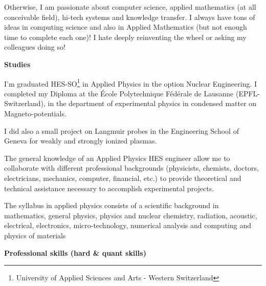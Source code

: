 	Otherwise, I am passionate about computer science, applied mathematics (at all conceivable field), hi-tech systems and knowledge transfer. I always have tons of ideas in computing science and also in Applied Mathematics (but not enough time to complete each one)! I hate deeply reinventing the wheel or asking my colleagues doing so!

\textbf{Studies}	

	I'm graduated HES-SO\footnote{University of Applied Sciences and Arts - Western Switzerland} in Applied Physics in the option Nuclear Engineering. I completed  my Diploma at the École Polytechnique Fédérale de Lausanne (EPFL-Switzerland), in the department of experimental physics in condensed matter on Magneto-potentials.
	
	 I did also a small project on Langmuir probes in the Engineering School of Geneva for weakly and strongly ionized plasmas.
	
	The general knowledge of an Applied Physics HES engineer allow me to collaborate with different professional backgrounds (physicists, chemists, doctors, electricians, mechanics, computer, financial, etc.) to provide theoretical and technical assistance necessary to accomplish experimental projects.

	The syllabus in applied physics consists of a scientific background in mathematics, general physics, physics and nuclear chemistry, radiation, acoustic, electrical, electronics, micro-technology, numerical analysis and computing and physics of materials

\textbf{Professional skills (hard \& quant skills)}

